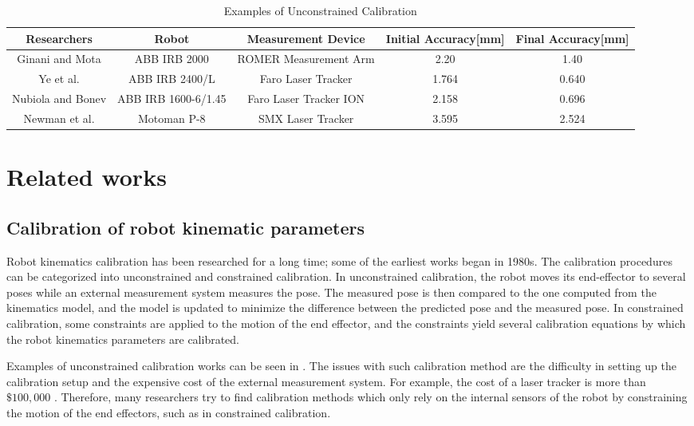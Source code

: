 \renewcommand{\arraystretch}{1.5}
\begin{table*}[htp]
\caption{Examples of Unconstrained Calibration}
\label{tab:unconstrained_calib}
\centering
\begin{tabular}{c c c c c}
\toprule
\textbf{Researchers} &  \textbf{Robot} & \textbf{Measurement Device} &  \textbf{Initial Accuracy[mm]}  & \textbf{Final Accuracy[mm]}\\
\midrule
Ginani and Mota \cite{Ginani2011} & ABB IRB 2000 & ROMER Measurement Arm & 2.20 & 1.40 \\
Ye et al. \cite{Ye2006} & ABB IRB 2400/L & Faro Laser Tracker & 1.764 & 0.640 \\
Nubiola and Bonev \cite{Nubiola2013} & ABB IRB 1600-6/1.45 & Faro Laser Tracker ION & 2.158 & 0.696 \\ 
Newman et al. \cite{Newman2000} & Motoman P-8 & SMX Laser Tracker & 3.595 & 2.524\\
\bottomrule
\end{tabular}
\end{table*}

\section{Related works}
\label{sec:related}
\subsection{Calibration of robot kinematic parameters}
\label{sec:kine_calib}



Robot kinematics calibration has been researched for a long time; some of the earliest works began in 1980s. The calibration procedures can be categorized into unconstrained and constrained calibration. In unconstrained calibration, the robot moves its end-effector to several poses while an external measurement system measures the pose. The measured pose is then compared to the one computed from the kinematics model, and the model is updated to minimize the difference between the predicted pose and the measured pose. In constrained calibration, some constraints are applied to the motion of the end effector, and the constraints yield several calibration equations by which the robot kinematics parameters are calibrated. 


Examples of unconstrained calibration works can be seen in . The issues with such calibration method are the difficulty in setting up the calibration setup and the expensive cost of the external measurement system. For example, the cost of a laser tracker is more than $\$100,000$ \cite{Nubiola2013}. Therefore, many researchers try to find calibration methods which only rely on the internal sensors of the robot by constraining the motion of the end effectors, such as in constrained calibration. 

